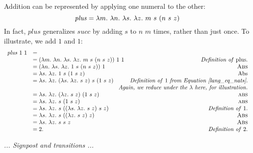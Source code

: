 \documentclass[12pt]{report}
\begin{document}
Addition can be represented by applying one numeral to the other:
\begin{equation}
  \mathit{plus} = \lambda m.\ \lambda n.\ \lambda s.\ \lambda z.\ m\ s\ (n\ s\ z)
\end{equation}
In fact, $\mathit{plus}$ generalizes $\mathit{succ}$ by adding $s$ to
$n$ $m$ times, rather than just once. To illustrate, we add
$1$ and $1$:
\begin{equation*}
  \begin{array}{llr}
    \lamApp{\mathit{plus}}{\lamApp{1}{1}} &= \\
    &= \lamAppP{\lamPlus}{\lamApp{1}{1}} & \text{\emph{Definition of} plus}. \\
    &= \lamAppP{\lamAbs{n}{\lamAbs{s}{\lamAbs{z}{\lamApp{1}{\lamApPp{s}{\lamApp{n}{\lamApp{s}{z}}}}}}}}{1} & \text{\sc Abs} \\
    &= \lamAbs{s}{\lamAbs{z}{\lamApp{1}{\lamApPp{s}{\lamApp{1}{\lamApp{s}{z}}}}}} & \text{Abs} \\
    &= \lamAbs{s}{\lamAbs{z}{\lamApp{(\lamAbs{s}{\lamAbs{z}{\lamApp{s}{z}}})}{\lamApPp{s}{\lamApp{1}{\lamApp{s}{z}}}}}} & \text{\emph{Definition of}\ 1 \emph{from Equation~\ref{lang_eq_nats}}.} \\
    & \multicolumn{2}{r}{\emph{Again, we reduce under the $\lambda$ here, for illustration.}} \\
    &= \lamAbs{s}{\lamAbs{z}{\lamApp{(\lamAbs{z}{\lamApp{s}{z}})}{(\lamApp{1}{\lamApp{s}{z}})}}} & \text{\sc abs} \\

    &= \lamAbs{s}{\lamAbs{z}{\lamApp{s}{(\lamApp{1}{\lamApp{s}{z}})}}} & \text{\sc abs} \\
    &= \lamAbs{s}{\lamAbs{z}{\lamApp{s}{(\lamApp{(\lamAbs{s}{\lamAbs{z}{\lamApp{s}{z}}})}{\lamApp{s}{z}})}}} & \text{\emph{Definition of}\ 1.} \\
    &= \lamAbs{s}{\lamAbs{z}{\lamApp{s}{(\lamApp{(\lamAbs{z}{\lamApp{s}{z}})}{z})}}} & \text{\sc Abs} \\
    &= \lamAbs{s}{\lamAbs{z}{\lamApp{s}{\lamApp{s}{z}}}} & \text{\sc Abs} \\
    &= 2. & \text{\emph{Definition of}\ 2.}
  \end{array}
\end{equation*}

\emph{ ... Signpost and transitions ...}

\end{document}
